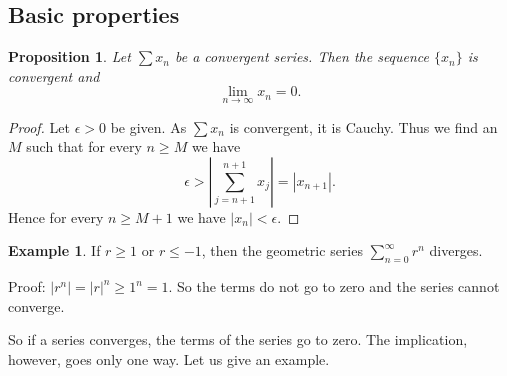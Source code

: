 \documentclass[12pt]{book}
\newcommand{\abs}[1]{\left\lvert {#1} \right\rvert}
\theoremstyle{plain}
\newtheorem{prop}[thm]{Proposition}
\theoremstyle{remark}
\theoremstyle{definition}
\theoremstyle{exercise}
\theoremstyle{example}
\newtheorem{example}[thm]{Example}
\begin{document}
\subsection{Basic properties}

\begin{prop}
Let $\sum x_n$ be a convergent series.  Then
the sequence $\{ x_n \}$ is convergent and
\begin{equation*}
\lim_{n\to\infty} x_n = 0.
\end{equation*}
\end{prop}

\begin{proof}
Let $\epsilon > 0$ be given.  As $\sum x_n$ is convergent, it is Cauchy.
Thus we find an $M$ such that for every $n \geq M$ we have
\begin{equation*}
\epsilon > 
\abs{ \sum_{j={n+1}}^{n+1} x_j }
=
\abs{ x_{n+1} } .
\end{equation*}
Hence for every $n \geq M+1$ we have $\abs{x_{n}} < \epsilon$.
\end{proof}

\begin{example}
If $r \geq 1$ or $r \leq -1$, then the geometric series $\sum_{n=0}^\infty r^n$
diverges.

Proof: $\abs{r^n} = \abs{r}^n \geq 1^n = 1$.  So the terms do not go to zero
and the series cannot converge.
\end{example}

So if a series converges, the terms of the series go to zero.
The implication, however, goes only one way.
Let us give an example.
\end{document}
